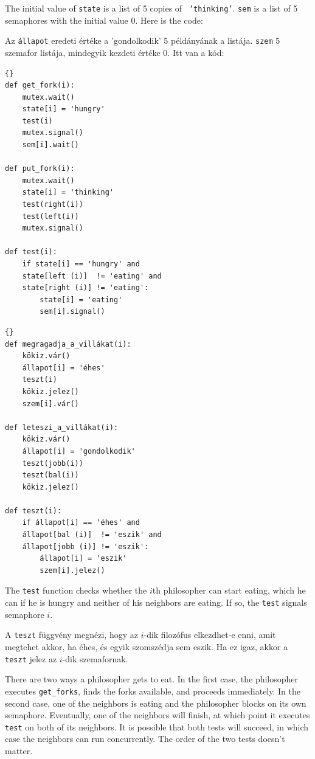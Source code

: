 \documentclass{book}
\begin{document}
The initial value of {\tt state} is a list of 5 copies of {\tt
'thinking'}.  {\tt sem} is a list of 5 semaphores with the initial
value 0.  Here is the code:

Az {\tt állapot} eredeti értéke a 'gondolkodik' 5 példányának a
listája. {\tt szem} 5 szemafor listája, mindegyik kezdeti értéke 0.
Itt van a kód:

\begin{lstlisting}[title={Tanenbaum's solution}]{}
def get_fork(i):
    mutex.wait()
    state[i] = 'hungry'
    test(i)
    mutex.signal()
    sem[i].wait()

def put_fork(i):
    mutex.wait()
    state[i] = 'thinking'
    test(right(i))
    test(left(i))
    mutex.signal()

def test(i):
    if state[i] == 'hungry' and
    state[left (i)]  != 'eating' and
    state[right (i)] != 'eating':
        state[i] = 'eating'
        sem[i].signal()
\end{lstlisting}


\begin{lstlisting}[title={Tanenbaum megoldása}]{}
def megragadja_a_villákat(i):
    kökiz.vár()
    állapot[i] = 'éhes'
    teszt(i)
    kökiz.jelez()
    szem[i].vár()

def leteszi_a_villákat(i):
    kökiz.vár()
    állapot[i] = 'gondolkodik'
    teszt(jobb(i))
    teszt(bal(i))
    kökiz.jelez()

def teszt(i):
    if állapot[i] == 'éhes' and
    állapot[bal (i)]  != 'eszik' and
    állapot[jobb (i)] != 'eszik':
        állapot[i] = 'eszik'
        szem[i].jelez()
\end{lstlisting}


The {\tt test} function checks whether the $i$th philosopher can
start eating, which he can if he is hungry and
neither of his neighbors are eating.  If so, the {\tt test} signals
semaphore $i$.

A {\tt teszt} függvény megnézi, hogy az $i$-dik filozófus elkezdhet-e enni,
amit megtehet akkor, ha éhes, és egyik szomszédja sem eszik. Ha ez
igaz, akkor a {\tt teszt} jelez az $i$-dik szemafornak.

There are two ways a philosopher gets to eat.  In the first case, the
philosopher executes {\tt get\_forks}, finds the forks available, and
proceeds immediately.  In the second case, one of the neighbors is
eating and the philosopher blocks on its own semaphore.  Eventually,
one of the neighbors will finish, at which point it executes {\tt
test} on both of its neighbors.  It is possible that both tests
will succeed, in which case the neighbors can run concurrently.
The order of the two tests doesn't matter.
\end{document}
